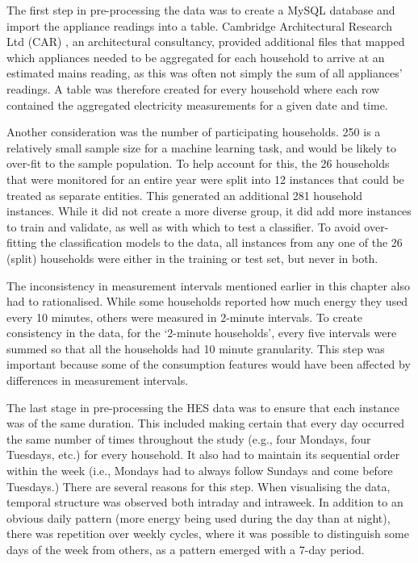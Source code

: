 The first step in pre-processing the data was to create a MySQL database and import the appliance readings into a table. Cambridge Architectural Research Ltd (CAR) \cite{CARG_1}, an architectural consultancy, provided additional files that mapped which appliances needed to be aggregated for each household to arrive at an estimated mains reading, as this was often not simply the sum of all appliances' readings. A table was therefore created for every household where each row contained the aggregated electricity measurements for a given date and time. 

Another consideration was the number of participating households.  250 is a relatively small sample size for a machine learning task, and would be likely to over-fit to the sample population. To help account for this, the 26 households that were monitored for an entire year were split into 12 instances that could be treated as separate entities.  This generated an additional 281 household instances. While it did not create a more diverse group, it did add more instances to train and validate, as well as with which to test a classifier. To avoid over-fitting the classification models to the data, all instances from any one of the 26 (split) households were either in the training or test set, but never in both.

The inconsistency in measurement intervals mentioned earlier in this chapter also had to rationalised. While some households reported how much energy they used every 10 minutes, others were measured in 2-minute intervals. To create consistency in the data, for the `2-minute households', every five intervals were summed so that all the households had 10 minute granularity. This step was important because some of the consumption features would have been affected by differences in measurement intervals. 

The last stage in pre-processing the HES data was to ensure that each instance was of the same duration.  This included making certain that every day occurred the same number of times throughout the study (e.g., four Mondays, four Tuesdays, etc.) for every household.  It also had to maintain its sequential order within the week (i.e., Mondays had to always follow Sundays and come before Tuesdays.)  There are several reasons for this step.  When visualising the data, temporal structure was observed both intraday and intraweek. In addition to an obvious daily pattern (more energy being used during the day than at night), there was repetition over weekly cycles, where it was possible to distinguish some days of the week from others, as a pattern emerged with a 7-day period.  

